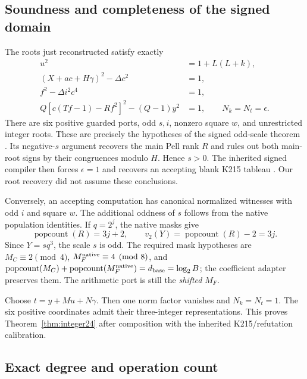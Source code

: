 \subsection{Soundness and completeness of the signed domain}

The roots just reconstructed satisfy exactly
\begin{align*}
 u^2&=1+L(L+k),\\
 (X+ac+H\gamma)^2-\Delta c^2&=1,\\
 f^2-\Delta i^2c^4&=1,\\
 Q[c(Tf-1)-Rf^2]^2-(Q-1)y^2&=1,
 \qquad N_k=N_t=\epsilon.
\end{align*}
There are six positive guarded ports, odd $s,i$, nonzero square $w$,
and unrestricted integer roots. These are precisely the hypotheses of
the signed odd-scale theorem \cite{oddscale}. Its negative-$s$ argument
recovers the main Pell rank $R$ and rules out both main-root signs by
their congruences modulo $H$. Hence $s>0$. The inherited signed compiler
then forces $\epsilon=1$ and recovers an accepting blank K215 tableau
\cite{normalized}. Our root recovery did not assume these conclusions.

Conversely, an accepting computation has canonical normalized witnesses
with odd $i$ and square $w$. The additional oddness of $s$ follows from
the native population identities. If $q=2^j$, the native masks give
\[
 \operatorname{popcount}(R)=3j+2,
 \qquad v_2(Y)=\operatorname{popcount}(R)-2=3j.
\]
Since $Y=sq^3$, the scale $s$ is odd. The required mask hypotheses are
$M_C\equiv2\pmod4$, $M_F^{\rm native}\equiv4\pmod8$, and
$\operatorname{popcount}(M_C)+
\operatorname{popcount}(M_F^{\rm native})=d_{\rm base}=\log_2B$;
the coefficient adapter preserves them. The arithmetic port is still
the \emph{shifted} $M_F$.

Choose $t=y+Mu+N\gamma$. Then one norm factor vanishes and
$N_k=N_t=1$. The six positive coordinates admit their three-integer
representations. This proves Theorem~\ref{thm:integer24} after composition
with the inherited K215/refutation calibration.

\subsection{Exact degree and operation count}

